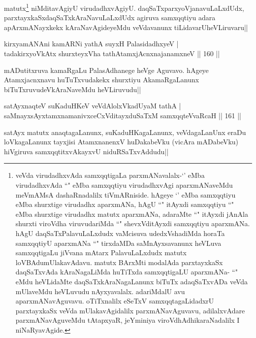 \begin{artha}
matutx\footnote[1]{veVda virudadhxvAda samxqqtigaLa parxmANavalalx-`\stext' eMba virudadhxvAda ``\stext " eMba samxqqtiyu virudadhxvAgi aparxmANaveMdu meVmAMsA dashaRnadalilx tiVmARniside. hAgeye `\stext' eMba samxqqtiyu \stext eMba shurxtige virudadhx aparxmANa, hAgU ``\stext " itAyxdi samxqqtiyu ``\stext " eMba shurxtige virudadhx matutx aparxmANa, adaraMte ``\stext " itAyxdi jAnAla shurxti viroVdha viruvudariMda ``\stext " shevxVditAyxdi samxqqtiyu aparxmANa. hAgU daqSaTxPalavuLaLxdudx vaMcisuva udedxVshadiMda horaTa samxqqtiyU aparxmANa ``\stext " tirxdaMDa saMnAyxsavanunx heVLuva samxqqtigaLu jiVvana mAtarx PalavuLaLxdudx matutx loVBAdumUlakavAdavu. matutx BArxMti modalAda parxtayxkaSx daqSaTxvAda kAraNagaLiMda huTiTxda samxqqtigaLU aparxmANa- ``\stext " eMdu heVLidaMte daqSaTxkAraNagaLanunx biTuTx adaqSaTxvADa veVda mUlaveMdu heVLuvudu nAyxyavalalx. adariMdalU avu aparxmANavAguvavu. oTiTxnalilx eSeTxV samxqqtagaLidadxrU parxtayxkaSx veVda mUlakavAgidalilx parxmANavAguvavu, adilalxvAdare parxmANavAguveMdu tAtapxyaR, jeYminiya viroVdhAdhikaraNadalilx I niNaRyavAgide.} niMditavAgiyU virudadhxvAgiyU. daqSaTxparxyoVjanavuLaLxdUdx, parxtayxkaSxdaqSaTxkAraNavuLaLxdUdx agiruva samxqqtiyu adara apArxmANayxkekx kAraNavAgideyeMdu veVdavanunx tiLidavarUheVLiruvaru||
\end{artha}

\begin{shl}
kirxyamANAni kamARNi yathA suyxH PalasidadhxyeV |\\
tadakirxyoVkAtx shurxteyxVha tathA\s \s tamxjAcnxnajanamxneV \hfill || 160 ||
\end{shl}	

\begin{artha}%
mADutitxruva kamaRgaLu PalasAdhanege heVge Aguvavo. hAgeye Atamxjacnxnavu huTuTxvudakekx shurxtiyu AkamaRgaLanunx biTuTxruvudeVkAraNaveMdu heVLiruvudu||
\end{artha}


\begin{shl}
satAyxnaqteV suKaduHKeV veVdAlolxVkadUyaM tathA |\\
saMnayxsAyx\s \s tamxnamanivxceCxVditayxduSaTxM samxqqteVvaRcaH \hfill || 161 ||
\end{shl}

\begin{artha}
satAyx matutx anaqtagaLanunx, suKaduHKagaLanunx, veVdagaLanUnx eraDu loVkagaLanunx tayxjisi AtamxnanenxV huDakabeVku (vicAra mADabeVku) hiVgiruva samxqqtitxvAkayxvU niduRSaTxvAddudu||
\end{artha}

